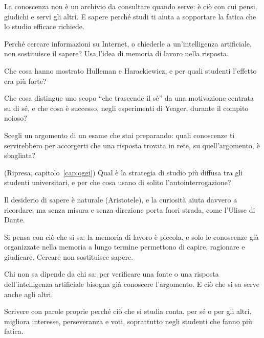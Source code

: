 \begin{daricordare}
La conoscenza non è un archivio da consultare quando serve: è ciò con
cui pensi, giudichi e servi gli altri. E sapere perché studi ti aiuta a
sopportare la fatica che lo studio efficace richiede.
\end{daricordare}

\begin{domande}
  \item Perché cercare informazioni su Internet, o chiederle a
        un'intelligenza artificiale, non sostituisce il sapere? Usa
        l'idea di memoria di lavoro nella risposta.
  \item Che cosa hanno mostrato Hulleman e Harackiewicz, e per quali
        studenti l'effetto era più forte?
  \item Che cosa distingue uno scopo \enquote{che trascende il sé} da una
        motivazione centrata su di sé, e che cosa è successo, negli
        esperimenti di Yeager, durante il compito noioso?
  \item Scegli un argomento di un esame che stai preparando: quali
        conoscenze ti servirebbero per accorgerti che una risposta
        trovata in rete, su quell'argomento, è sbagliata?
  \item (Ripresa, capitolo~\ref{cap:oggi}) Qual è la strategia di studio
        più diffusa tra gli studenti universitari, e per che cosa usano
        di solito l'autointerrogazione?
\end{domande}

\begin{sintesi}
  \item Il desiderio di sapere è naturale (Aristotele), e la curiosità
        aiuta davvero a ricordare; ma senza misura e senza direzione
        porta fuori strada, come l'Ulisse di Dante.
  \item Si pensa con ciò che si sa: la memoria di lavoro è piccola, e
        solo le conoscenze già organizzate nella memoria a lungo termine
        permettono di capire, ragionare e giudicare. Cercare non
        sostituisce sapere.
  \item Chi non sa dipende da chi sa: per verificare una fonte o una
        risposta dell'intelligenza artificiale bisogna già conoscere
        l'argomento. E ciò che si sa serve anche agli altri.
  \item Scrivere con parole proprie perché ciò che si studia conta, per
        sé o per gli altri, migliora interesse, perseveranza e voti,
        soprattutto negli studenti che fanno più fatica.
\end{sintesi}

\finecapitolo
